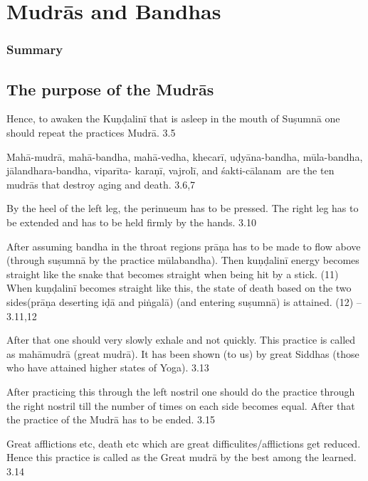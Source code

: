 \chapter{Mudrās and Bandhas}

\subsection*{Summary}

\section*{The purpose of the Mudrās}

Hence, to awaken the Kuṇḍalinī that is asleep in the mouth of Suṣumnā one should repeat the practices Mudrā. 3.5


Mahā-mudrā,  mahā-bandha,  mahā-vedha,  khecarī, uḍyāna-bandha, mūla-bandha, jālandhara-bandha, viparīta- karaṇī, vajrolī, and  śakti-cālanam are the ten mudrās that destroy  aging and death. 3.6,7


By the heel of the left leg, the perinueum has to be pressed. The right leg has to be extended and has to be held firmly by the hands.   3.10

After assuming bandha in the throat regions prāṇa has to be made to flow above (through suṣumnā by the practice  mūlabandha). Then kuṇḍalinī energy becomes straight like the snake that becomes straight when being hit by a stick. (11) When kuṇḍalinī becomes straight like this, the state of death based on the two sides(prāṇa deserting iḍā and piṅgalā) (and entering suṣumnā) is attained. (12) – 3.11,12

After that one should very slowly exhale and not quickly. This practice is called as mahāmudrā (great mudrā). It has been shown (to us) by great Siddhas (those who have attained higher states of Yoga).  3.13

After practicing this through the left nostril one should do the practice through the right nostril till the number of times on each side becomes equal. After that the practice of the Mudrā has to be ended. 3.15


Great afflictions etc, death etc which are great difficulites/afflictions get reduced. Hence this practice is called as the Great mudrā by the best among the learned. 3.14

